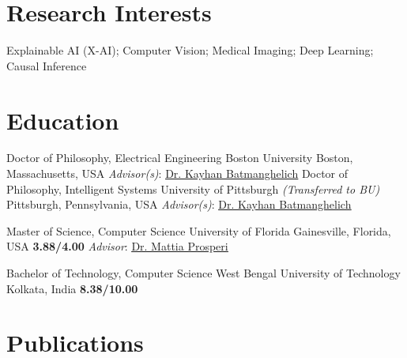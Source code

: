 \documentclass[11pt,letter,sans]{moderncv}
\begin{document}
\makecvtitle

\section{ Research Interests }
Explainable AI (X-AI); Computer Vision; Medical Imaging; Deep Learning; Causal Inference
\section{ Education }
      {Doctor of Philosophy, Electrical Engineering}%
      {Boston University}%
      {Boston, Massachusetts, USA}%
      {}%
      {
        \textit{Advisor(s)}: 
        {\href{https://www.batman-lab.com/}
        { \underline{Dr. Kayhan Batmanghelich}}}
      }
      {Doctor of Philosophy, Intelligent Systems}%
      {University of Pittsburgh \emph{(Transferred to BU)}}%
      {Pittsburgh, Pennsylvania, USA}%
      {}%
      {
        \textit{Advisor(s)}: 
        {\href{https://www.batman-lab.com/}
        { \underline{Dr. Kayhan Batmanghelich}}}
      }
      
      
      {Master of Science, Computer Science}%
      {University of Florida}%
      {Gainesville, Florida, USA}%
      {\textbf{3.88/4.00}}%
      {}%
      {
        \textit{Advisor}: {\href{https://epidemiology.phhp.ufl.edu/disl/}
        { \underline{Dr. Mattia Prosperi}}}
      }
      
      {Bachelor of Technology, Computer Science}%
      {West Bengal University of Technology}%
      {Kolkata, India}%
      {\textbf{8.38/10.00}}%
      {}%
      {}

\section{ Publications}
  \nocite{*}
\end{document}
